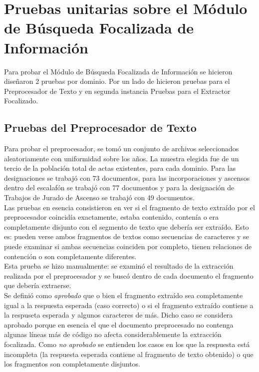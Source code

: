 \section{Pruebas unitarias sobre el Módulo de Búsqueda Focalizada de Información}

Para probar el Módulo de Búsqueda Focalizada de Información se hicieron diseñaron 2 pruebas por dominio. Por un lado de hicieron pruebas para el Preprocesador de Texto y en segunda instancia Pruebas para el Extractor Focalizado. 

\subsection{Pruebas del Preprocesador de Texto}

Para probar el preprocesador, se tomó un conjunto de archivos seleccionados aleatoriamente con uniformidad sobre los años. La muestra elegida fue de un tercio de la población total de actas existentes, para cada dominio. Para las designaciones se trabajó con 73 documentos, para las incorporaciones y ascensos dentro del escalafón se trabajó con 77 documentos y para la designación de Trabajos de Jurado de Ascenso se trabajó con 49 documentos. \\

Las pruebas en esencia consistieron en ver si el fragmento de texto extraído por el preprocesador coincidía exactamente, estaba contenido, contenía o era completamente disjunto con el segmento de texto que debería ser extraído. Esto es: pueden verse ambos fragmentos de textos como secuencias de caracteres y se puede examinar si ambas secuencias coinciden por completo, tienen relaciones de contención o son completamente diferentes. \\

Esta prueba se hizo manualmente: se examinó el resultado de la extracción realizada por el preprocesador y se buscó dentro de cada documento el fragmento que debería extraerse. \\

Se definió como \emph{aprobado} que o bien el fragmento extraído sea completamente igual a la respuesta esperada (caso correcto) o si el fragmento extraído contiene a la respuseta esperada y algunos caracteres de más. Dicho caso se considera aprobado porque en esencia el que el documento preprocesado no contenga algunas líneas más de código no afecta considerablemente la extracción focalizada. Como \emph{no aprobado} se entienden los casos en los que la respuesta está incompleta (la respuesta esperada contiene al fragmento de texto obtenido) o que los fragmentos son completamente disjuntos. \\


